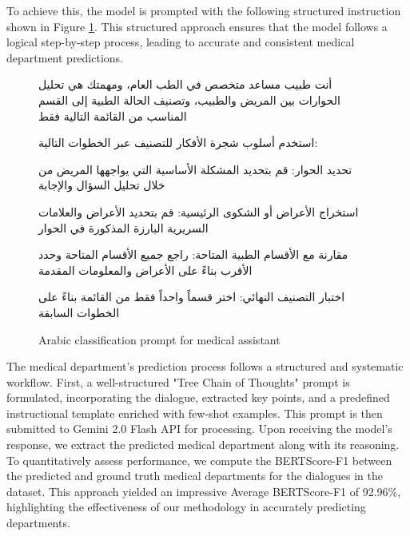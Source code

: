 \documentclass[manuscript,screen,review]{acmart}
\begin{document}
To achieve this, the model is prompted with the following structured instruction shown in Figure \ref{prompt:prompt32}. This structured approach ensures that the model follows a logical step-by-step process, leading to accurate and consistent medical department predictions.




\begin{figure}[ht]
\centering
\begin{tcolorbox}[
  colback=black!5!white,
  colframe=black,
  fonttitle=\bfseries,
  title=Prompt,
  arc=5pt,
  boxrule=0.8pt,
  fontupper=\small, %
  width=\textwidth,
]
\begin{otherlanguage}{arabic}
أنت طبيب مساعد متخصص في الطب العام، ومهمتك هي تحليل الحوارات بين المريض والطبيب، وتصنيف الحالة الطبية إلى القسم المناسب من القائمة التالية فقط

استخدم أسلوب شجرة الأفكار للتصنيف عبر الخطوات التالية:

تحديد الحوار: قم بتحديد المشكلة الأساسية التي يواجهها المريض من خلال تحليل السؤال والإجابة

استخراج الأعراض أو الشكوى الرئيسية: قم بتحديد الأعراض والعلامات السريرية البارزة المذكورة في الحوار

مقارنة مع الأقسام الطبية المتاحة: راجع جميع الأقسام المتاحة وحدد الأقرب بناءً على الأعراض والمعلومات المقدمة

اختبار التصنيف النهائي: اختر قسماً واحداً فقط من القائمة بناءً على الخطوات السابقة
\end{otherlanguage}
\end{tcolorbox}
\caption{Arabic classification prompt for medical assistant}
\label{prompt:prompt32}
\end{figure}



The medical department's prediction process follows a structured and systematic workflow. First, a well-structured "Tree Chain of Thoughts" prompt is formulated, incorporating the dialogue, extracted key points, and a predefined instructional template enriched with few-shot examples. This prompt is then submitted to Gemini 2.0 Flash API for processing. Upon receiving the model’s response, we extract the predicted medical department along with its reasoning. To quantitatively assess performance, we compute the BERTScore-F1 between the predicted and ground truth medical departments for the dialogues in the dataset. This approach yielded an impressive Average BERTScore-F1 of 92.96\%, highlighting the effectiveness of our methodology in accurately predicting departments.
\end{document}
